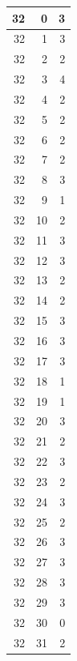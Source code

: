 \documentclass{article}
\begin{document}
\begin{multicols}{2}
{\begin{longtable}{|r|r|r|}
\hline 32 & 0 & 3  \\ 
\hline 32 & 1 & 3  \\ 
\hline 32 & 2 & 2  \\ 
\hline 32 & 3 & 4  \\ 
\hline 32 & 4 & 2  \\ 
\hline 32 & 5 & 2  \\ 
\hline 32 & 6 & 2  \\ 
\hline 32 & 7 & 2  \\ 
\hline 32 & 8 & 3  \\ 
\hline 32 & 9 & 1  \\ 
\hline 32 & 10 & 2 \\ 
\hline 32 & 11 & 3 \\ 
\hline 32 & 12 & 3 \\ 
\hline 32 & 13 & 2 \\ 
\hline 32 & 14 & 2 \\ 
\hline 32 & 15 & 3 \\ 
\hline 32 & 16 & 3 \\ 
\hline 32 & 17 & 3 \\ 
\hline 32 & 18 & 1 \\ 
\hline 32 & 19 & 1 \\ 
\hline 32 & 20 & 3 \\ 
\hline 32 & 21 & 2 \\ 
\hline 32 & 22 & 3 \\ 
\hline 32 & 23 & 2 \\ 
\hline 32 & 24 & 3 \\ 
\hline 32 & 25 & 2 \\ 
\hline 32 & 26 & 3 \\ 
\hline 32 & 27 & 3 \\ 
\hline 32 & 28 & 3 \\ 
\hline 32 & 29 & 3 \\ 
\hline 32 & 30 & 0 \\ 
\hline 32 & 31 & 2 \\ 


\end{longtable}}
\end{multicols}
\end{document}
